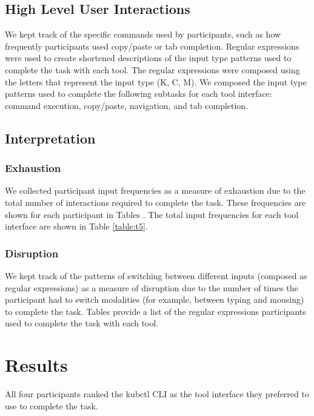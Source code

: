 \documentclass[11pt, oneside]{article}   	%
\begin{document}
\subsection{High Level User Interactions}
We kept track of the specific commands used by participants, such as how frequently participants used copy/paste or tab completion. Regular expressions were used to create shortened descriptions of the input type patterns used to complete the task with each tool. The regular expressions were composed using the letters that represent the input type (K, C, M). We composed the input type patterns used to complete the following subtasks for each tool interface: command execution, copy/paste, navigation, and tab completion. 

\subsection{Interpretation}
\subsubsection{Exhaustion}
We collected participant input frequencies as a measure of exhaustion due to the total number of interactions required to complete the task. These frequencies are shown for each participant in Tables \text{\ref{table:t1}--\ref{table:t4}}. The total input frequencies for each tool interface are shown in Table \ref{table:t5}.

\subsubsection{Disruption}
We kept track of the patterns of switching between different inputs (composed as regular expressions) as a measure of disruption due to the number of times the participant had to switch modalities (for example, between typing and mousing) to complete the task. Tables \text{\ref{table:t6}--\ref{table:t9}} provide a list of the regular expressions participants used to complete the task with each tool.

\section{Results}

All four participants ranked the kubctl CLI as the tool interface they preferred to use to complete the task. 

\end{document}
